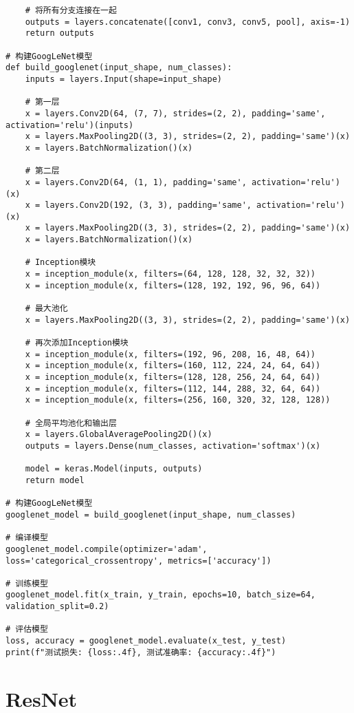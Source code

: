 \begin{lstlisting}
    # 将所有分支连接在一起
    outputs = layers.concatenate([conv1, conv3, conv5, pool], axis=-1)
    return outputs

# 构建GoogLeNet模型
def build_googlenet(input_shape, num_classes):
    inputs = layers.Input(shape=input_shape)

    # 第一层
    x = layers.Conv2D(64, (7, 7), strides=(2, 2), padding='same', activation='relu')(inputs)
    x = layers.MaxPooling2D((3, 3), strides=(2, 2), padding='same')(x)
    x = layers.BatchNormalization()(x)

    # 第二层
    x = layers.Conv2D(64, (1, 1), padding='same', activation='relu')(x)
    x = layers.Conv2D(192, (3, 3), padding='same', activation='relu')(x)
    x = layers.MaxPooling2D((3, 3), strides=(2, 2), padding='same')(x)
    x = layers.BatchNormalization()(x)

    # Inception模块
    x = inception_module(x, filters=(64, 128, 128, 32, 32, 32))
    x = inception_module(x, filters=(128, 192, 192, 96, 96, 64))

    # 最大池化
    x = layers.MaxPooling2D((3, 3), strides=(2, 2), padding='same')(x)

    # 再次添加Inception模块
    x = inception_module(x, filters=(192, 96, 208, 16, 48, 64))
    x = inception_module(x, filters=(160, 112, 224, 24, 64, 64))
    x = inception_module(x, filters=(128, 128, 256, 24, 64, 64))
    x = inception_module(x, filters=(112, 144, 288, 32, 64, 64))
    x = inception_module(x, filters=(256, 160, 320, 32, 128, 128))

    # 全局平均池化和输出层
    x = layers.GlobalAveragePooling2D()(x)
    outputs = layers.Dense(num_classes, activation='softmax')(x)

    model = keras.Model(inputs, outputs)
    return model

# 构建GoogLeNet模型
googlenet_model = build_googlenet(input_shape, num_classes)

# 编译模型
googlenet_model.compile(optimizer='adam', loss='categorical_crossentropy', metrics=['accuracy'])

# 训练模型
googlenet_model.fit(x_train, y_train, epochs=10, batch_size=64, validation_split=0.2)

# 评估模型
loss, accuracy = googlenet_model.evaluate(x_test, y_test)
print(f"测试损失: {loss:.4f}, 测试准确率: {accuracy:.4f}")

\end{lstlisting}


\section{ResNet}
